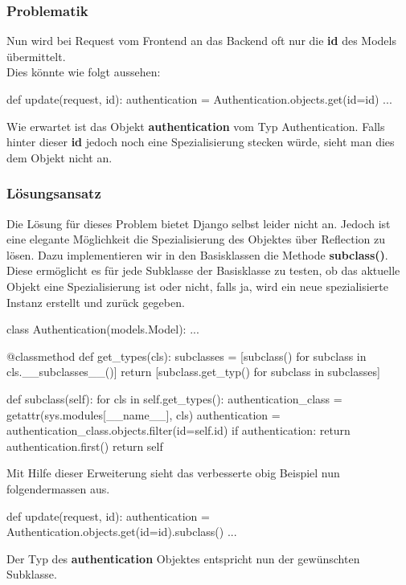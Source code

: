 \subsubsection{Problematik}
Nun wird bei Request vom Frontend an das Backend oft nur die \textbf{id} des Models übermittelt.\\
Dies könnte wie folgt aussehen:
\medskip
\begin{python}
def update(request, id):
    authentication = Authentication.objects.get(id=id)
    ...
\end{python}
\medskip
Wie erwartet ist das Objekt \textbf{authentication} vom Typ Authentication. Falls hinter dieser \textbf{id} jedoch noch eine Spezialisierung stecken würde, sieht man dies dem Objekt nicht an.
\subsubsection{Lösungsansatz}
Die Lösung für dieses Problem bietet Django selbst leider nicht an. Jedoch ist eine elegante Möglichkeit die Spezialisierung des Objektes über Reflection zu lösen. Dazu implementieren wir in den Basisklassen die Methode \textbf{subclass()}.\\
Diese ermöglicht es für jede Subklasse der Basisklasse zu testen, ob das aktuelle Objekt eine Spezialisierung ist oder nicht, falls ja, wird ein neue spezialisierte Instanz erstellt und zurück gegeben.
\medskip
\begin{python}
class Authentication(models.Model):
	...
	
    @classmethod
    def get_types(cls):
        subclasses = [subclass() for subclass in cls.__subclasses__()]
        return [subclass.get_typ() for subclass in subclasses]	
	
    def subclass(self):
        for cls in self.get_types():
            authentication_class = getattr(sys.modules[__name__], cls)
            authentication = authentication_class.objects.filter(id=self.id)
            if authentication:
                return authentication.first()
        return self
\end{python}
\medskip
Mit Hilfe dieser Erweiterung sieht das verbesserte obig Beispiel nun folgendermassen aus.
\medskip
\begin{python}
def update(request, id):
    authentication = Authentication.objects.get(id=id).subclass()
    ...
\end{python}
\medskip
Der Typ des \textbf{authentication} Objektes entspricht nun der gewünschten Subklasse.

